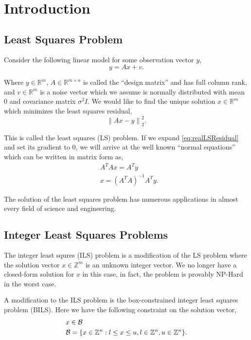 \documentclass[12pt,Bold,letterpaper]{mcgilletdclass}
\newcommand{\be}{\begin{equation}}
\newcommand{\ee}{\end{equation}}
\newcommand{\boxcon}{{\cal B}}
\begin{document}
 
\chapter{Introduction}
\section{Least Squares Problem}
Consider the following linear model for some observation vector $y$,
\begin{equation}
\label{eq:realLSModel}
y = Ax+v.
\end{equation}

Where $y\in\mathbb{R}^m$, $A\in\mathbb{R}^{m \times n}$ is called the
``design matrix'' and has full column rank, and $v\in\mathbb{R}^m$ is a
noise vector which we assume is normally distributed with mean $0$ and
covariance matrix $\sigma^2I$. We would like to find the unique solution
$x\in\mathbb{R}^m$ which minimizes the least squares residual,
\be
\label{eq:realLSResidual}
 \left \| Ax - y \right \|^2_2.
\ee

This is called the least squares (LS) problem. If we expand
\eqref{eq:realLSResidual} and set its gradient to $0$, we will arrive at the
well known ``normal equations'' which can be written in matrix form as,
\begin{align}
&A^TAx = A^Ty \\
\label{eq:normalEquations}
&x = (A^TA)^{-1}A^Ty.
\end{align}

The solution of the least squares problem has numerous applications in almost
every field of science and engineering.

\section{Integer Least Squares Problems}
The integer least squres (ILS) problem is a modification of the LS problem
where the solution vector $x\in\mathbb{Z}^m$ is an unknown integer vector. We
no longer have a closed-form solution for $x$ in this case, in fact, the
problem is provably NP-Hard in the worst case.

A modification to the ILS problem is the box-constrained integer least squares
problem (BILS). Here we have the following constraint on the solution
vector, 
\begin{align}
&x\in \boxcon\\
&\boxcon = \{x\in\mathbb{Z}^n : l\le x \le u, l\in \mathbb{Z}^n,
u\in\mathbb{Z}^n \}.
\end{align}
\end{document}
